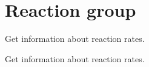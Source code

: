 \hypertarget{group__reaction}{
\section{\-Reaction group}
\label{group__reaction}
}


\-Get information about reaction rates.  


\-Get information about reaction rates. 